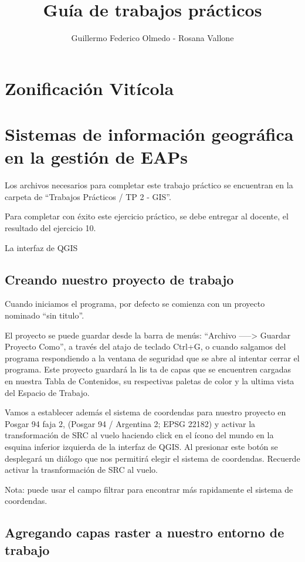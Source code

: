 \documentclass[]{article}
\title{Guía de trabajos prácticos}
\author{Guillermo Federico Olmedo - Rosana Vallone}
\begin{document}
\maketitle

\tableofcontents

\section{Zonificación Vitícola}

\section{Sistemas de información geográfica en la gestión de EAPs}

Los archivos necesarios para completar este trabajo práctico se encuentran en la carpeta de “Trabajos Prácticos / TP 2 - GIS”. 

Para completar con éxito este ejercicio práctico, se debe entregar al docente, el resultado del ejercicio 10. 

La interfaz de QGIS

\subsection{Creando nuestro proyecto de trabajo}

Cuando iniciamos el programa, por defecto se comienza con un proyecto nominado “sin titulo”.

El proyecto se puede guardar desde la barra de menús: “Archivo -----> Guardar Proyecto Como”, a través del atajo de teclado Ctrl+G, o cuando salgamos del programa respondiendo a la ventana de seguridad que se abre al intentar cerrar el programa. 
Este proyecto guardará la lis ta de capas que se encuentren cargadas en nuestra Tabla de Contenidos, su respectivas paletas de color y la ultima vista del Espacio de Trabajo.

Vamos a establecer además el sistema de coordendas para nuestro proyecto en Posgar 94 faja 2, (Posgar 94 / Argentina 2; EPSG 22182) y activar la transformación de SRC al vuelo haciendo click en el ícono del mundo en la esquina inferior izquierda de la interfaz de QGIS. 
Al presionar este botón se desplegará un diálogo que nos permitirá elegir el sistema de coordendas. Recuerde activar la trasnformación de SRC al vuelo.

Nota: puede usar el campo filtrar para encontrar más rapidamente el sistema de coordendas.

\subsection{Agregando capas raster a nuestro entorno de trabajo}
\end{document}
